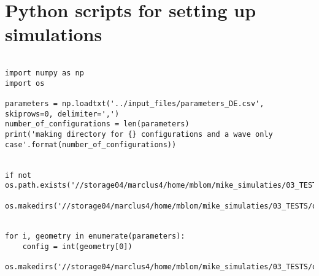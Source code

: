 \chapter{Python scripts for setting up simulations}
\label{app: scripts for setting up simulations}


    

\begin{mdframed}[backgroundcolor=light-gray, roundcorner=10pt,leftmargin=1, rightmargin=1, innerleftmargin=0, innertopmargin=7,innerbottommargin=0, outerlinewidth=1, linecolor=light-gray]
\begin{lstlisting}[linewidth=\columnwidth,caption=Script used for creating directories on cluster ., label=script: creating directories script]

import numpy as np
import os

parameters = np.loadtxt('../input_files/parameters_DE.csv', skiprows=0, delimiter=',')
number_of_configurations = len(parameters)
print('making directory for {} configurations and a wave only case'.format(number_of_configurations))


if not os.path.exists('//storage04/marclus4/home/mblom/mike_simulaties/03_TESTS/optimization_clusterfolder/ComFLOW_simulations'):
    os.makedirs('//storage04/marclus4/home/mblom/mike_simulaties/03_TESTS/optimization_clusterfolder/ComFLOW_simulations/wave_only/input_files')


for i, geometry in enumerate(parameters):
    config = int(geometry[0])
    os.makedirs('//storage04/marclus4/home/mblom/mike_simulaties/03_TESTS/optimization_clusterfolder/ComFLOW_simulations/configuration_{}/input_files'.format(config))


    
\end{lstlisting}
\end{mdframed}

